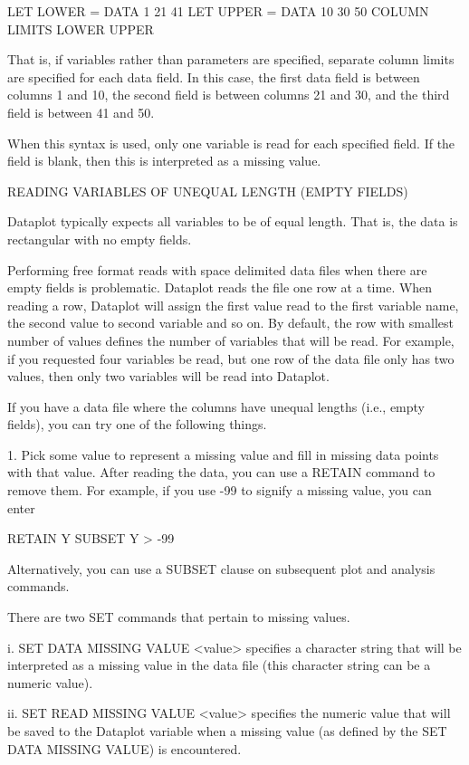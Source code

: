          LET LOWER = DATA  1  21   41
         LET UPPER = DATA 10  30   50
         COLUMN LIMITS LOWER UPPER

      That is, if variables rather than parameters are specified,
      separate column limits are specified for each data field.
      In this case, the first data field is between columns
      1 and 10, the second field is between columns 21 and 30, and
      the third field is between 41 and 50.

      When this syntax is used, only one variable is read for
      each specified field.  If the field is blank, then this is
      interpreted as a missing value.


READING VARIABLES OF UNEQUAL LENGTH (EMPTY FIELDS)

Dataplot typically expects all variables to be of equal length.  That is,
the data is rectangular with no empty fields.

Performing free format reads with space delimited data files when there
are empty fields is problematic.  Dataplot reads the file one row at a
time.  When reading a row, Dataplot will assign the first value read to
the first variable name, the second value to second variable and so on.
By default, the row with smallest number of values defines the number of
variables that will be read.  For example, if you requested four
variables be read, but one row of the data file only has two values, then
only two variables will be read into Dataplot.

If you have a data file where the columns have unequal lengths (i.e.,
empty fields), you can try one of the following things.

    1. Pick some value to represent a missing value and fill
       in missing data points with that value.  After reading
       the data, you can use a RETAIN command to remove them.
       For example, if you use -99 to signify a missing value,
       you can enter

          RETAIN Y SUBSET Y > -99

       Alternatively, you can use a SUBSET clause on subsequent
       plot and analysis commands.

       There are two SET commands that pertain to missing values.

            i. SET DATA MISSING VALUE <value> specifies a character
               string that will be interpreted as a missing value in the
               data file (this character string can be a numeric value).

           ii. SET READ MISSING VALUE <value> specifies the numeric value
               that will be saved to the Dataplot variable when a missing
               value (as defined by the SET DATA MISSING VALUE) is
               encountered.

